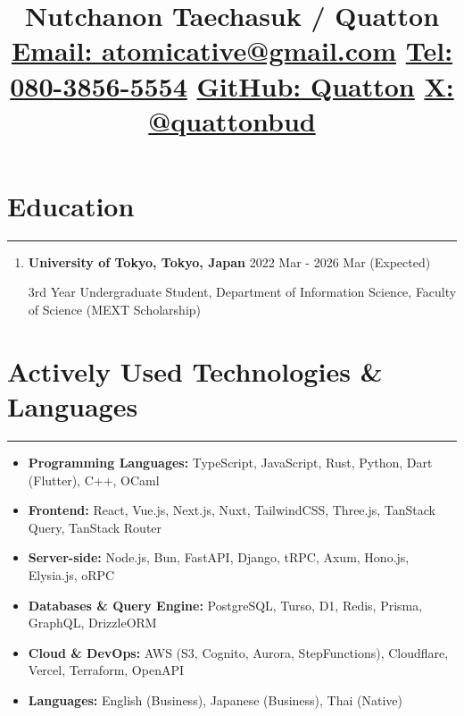 \documentclass[
  a4paper,
  10pt,
  dvipdfmx
]{article}
\begin{document}
\newcommand{\cvsection}[1]{
  \section*{#1}
  \hrule
  \bigskip
}

\title{
  \vspace{-2cm}Nutchanon Taechasuk / Quatton \\
  \vspace{0.25cm}
  \small{
    \href{mailto:atomicative@gmail.com}{Email: atomicative@gmail.com}
    \hfill
    \href{tel:+8180-3856-5554}{Tel: 080-3856-5554}
    \hfill
    \href{http://github.com/Quatton}{GitHub: Quatton}
    \hfill
    \href{http://x.com/quattonbud}{X: @quattonbud}
  }
  \vspace{-1.5cm}
}
\date{}
\maketitle
{}

\cvsection{Education}
\begin{enumerate}[]
  \item \textbf{University of Tokyo, Tokyo, Japan} \hfill 2022 Mar - 2026 Mar (Expected)

        3rd Year Undergraduate Student, Department of Information Science, Faculty of Science (MEXT Scholarship)
\end{enumerate}


\cvsection{Actively Used Technologies \& Languages}

\begin{itemize}
  \itemsep 0em
  \item \textbf{Programming Languages:} TypeScript, JavaScript, Rust, Python, Dart (Flutter), C++, OCaml
  \item \textbf{Frontend:} React, Vue.js, Next.js, Nuxt, TailwindCSS, Three.js, TanStack Query, TanStack Router
  \item \textbf{Server-side:} Node.js, Bun, FastAPI, Django, tRPC, Axum, Hono.js, Elysia.js, oRPC
  \item \textbf{Databases \& Query Engine:} PostgreSQL, Turso, D1, Redis, Prisma, GraphQL, DrizzleORM
  \item \textbf{Cloud \& DevOps:} AWS (S3, Cognito, Aurora, StepFunctions), Cloudflare, Vercel, Terraform, OpenAPI
  \item \textbf{Languages:} English (Business), Japanese (Business), Thai (Native)
\end{itemize}
\end{document}

